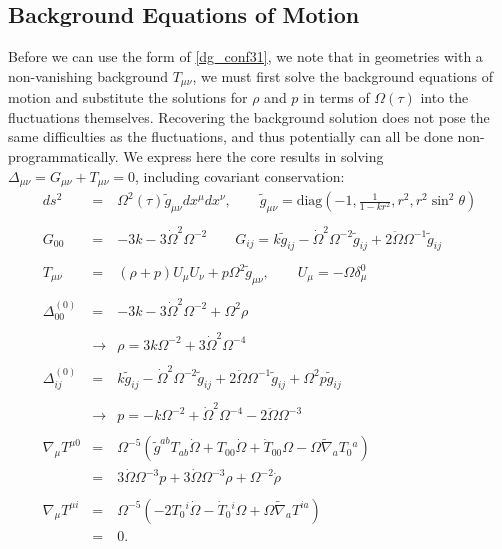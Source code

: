 \subsection{Background Equations of Motion}
Before we can use the form of \eqref{dg_conf31}, we note that in geometries with a non-vanishing background $T_{\mu\nu}$, we must first solve the background equations of motion and substitute the solutions for $\rho$ and $p$ in terms of $\Omega(\tau)$ into the fluctuations themselves. Recovering the background solution does not pose the same difficulties as the fluctuations, and thus potentially can all be done non-programmatically. We express here the core results in solving $\Delta_{\mu\nu} = G_{\mu\nu} + T_{\mu\nu} = 0$, including covariant conservation: 
\begin{eqnarray}
ds^2 &=& \Omega^2(\tau)\tilde g_{\mu\nu} dx^\mu dx^\nu,\qquad 
\tilde g_{\mu\nu} = \text{diag}\left(-1,\frac{1}{1-kr^2},r^2,r^2\sin^2\theta\right)
\label{geom}
\\ \nonumber\\
G_{00}&=& -3k - 3 \dot\Omega^2\Omega^{-2}
\qquad
G_{ij} = k\tilde g_{ij} - \dot\Omega^2\Omega^{-2}\tilde g_{ij} + 2\ddot\Omega \Omega^{-1} \tilde g_{ij}
\\ \nonumber\\
T_{\mu\nu} &=& (\rho+p)U_\mu U_\nu + p\Omega^2 \tilde g_{\mu\nu},\qquad U_\mu = - \Omega \delta^0_\mu  
\\ \nonumber\\
\Delta^{(0)}_{00} &=& -3k - 3 \dot\Omega^2\Omega^{-2} + \Omega^2 \rho
\\ \nonumber\\
&\to&\rho = 3k\Omega^{-2}+3\dot\Omega^2 \Omega^{-4}
\label{rho}
\\ \nonumber\\
\Delta^{(0)}_{ij} &=& k\tilde g_{ij} - \dot\Omega^2\Omega^{-2}\tilde g_{ij} + 2\ddot\Omega \Omega^{-1} \tilde g_{ij} + \Omega^2 p
\tilde g_{ij}
\\ \nonumber\\
&\to& p = -k\Omega^{-2} + \dot\Omega^2\Omega^{-4} -2\ddot\Omega \Omega^{-3}
\label{p}
\\ \nonumber\\
\nabla_\mu T^{\mu 0} &=& \Omega^{-5}\left( \tilde g^{ab} T_{ab} \dot{\Omega} + T_{00}{} \dot{\Omega} + \dot{T}_{00}{} \Omega -  \Omega \tilde{\nabla}_{a}T_{0}{}^{a}\right) 
\nonumber\\
&=& 3 \dot{\Omega}  \Omega^{-3}p + 3 \dot{\Omega}  \Omega^{-3}\rho +  \Omega^{-2}\dot{\rho}
\label{Tcons0}
\\ \nonumber\\
\nabla_\mu T^{\mu i} &=& \Omega^{-5}\left(-2 T_{0}{}^{i} \dot{\Omega} -  \dot{T}_{0}{}^{i} \Omega + \Omega \tilde{\nabla}_{a}T^{ia}\right)
\nonumber\\
&=&0.
\end{eqnarray}
%
%

